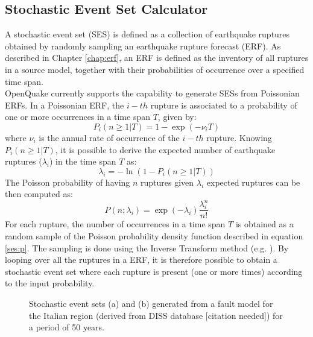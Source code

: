 \subsection{Stochastic Event Set Calculator}
A stochastic event set (SES) is defined as a collection of earthquake ruptures obtained by randomly sampling an earthquake rupture forecast (ERF). As described in Chapter \ref{chap:erf}, an ERF is defined as the inventory of all ruptures in a source model, together with their probabilities of occurrence over a specified time span.\\
OpenQuake currently supports the capability to generate SESs from Poissonian ERFs. In a Poissonian ERF, the $i-th$ rupture is associated to a probability of one or more occurrences in a time span $T$, given by:
\begin{equation}
P_{i}(n\geq1|T) = 1 - \exp(-\nu_{i} T)
\end{equation} 
where $\nu_{i}$ is the annual rate of occurrence of the $i-th$ rupture. Knowing $P_{i}(n\geq1|T)$, it is possible to derive the expected number of earthquake ruptures ($\lambda_{i}$) in the time span $T$  as:
\begin{equation}
\lambda_{i} = - \ln(1 - P_{i}(n\geq1|T))
\end{equation} 
The Poisson probability of having $n$ ruptures given $\lambda_{i}$ expected ruptures can be then computed as:
\begin{equation}
P(n;\lambda_{i}) = \exp(-\lambda_{i})\frac{\lambda_{i}^{n}}{n!}
\label{ses:p}
\end{equation}
For each rupture, the number of occurrences in a time span $T$ is obtained as a random sample of the Poisson probability density function described in equation \ref{ses:p}. The sampling is done using the Inverse Transform method (e.g. \cite{martinez2002}). By looping over all the ruptures in a ERF, it is therefore possible to obtain a stochastic event set where each rupture is present (one or more times) according to the input probability.\\
\begin{figure}[htbp]
\begin{center}
\caption{Stochastic event sets (a) and (b) generated from a fault model for the Italian region (derived from DISS database [citation needed]) for a period of 50 years.}
\label{default}
\end{center}
\end{figure}

